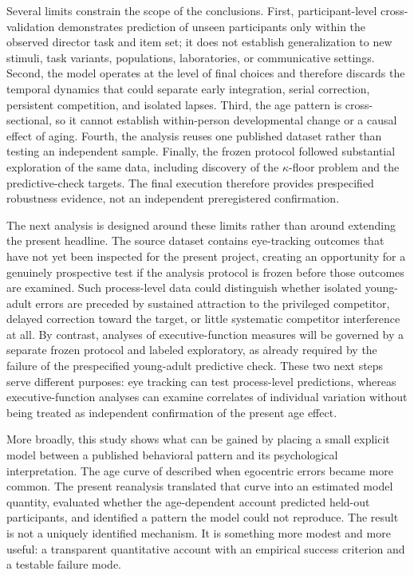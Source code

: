 \documentclass[11pt]{article}
\begin{document}
Several limits constrain the scope of the conclusions. First, participant-level
cross-validation demonstrates prediction of unseen participants only within the
observed director task and item set; it does not establish generalization to
new stimuli, task variants, populations, laboratories, or communicative
settings. Second, the model operates at the level of final choices and
therefore discards the temporal dynamics that could separate early integration,
serial correction, persistent competition, and isolated lapses. Third, the age
pattern is cross-sectional, so it cannot establish within-person developmental
change or a causal effect of aging. Fourth, the analysis reuses one published
dataset rather than testing an independent sample. Finally, the frozen protocol
followed substantial exploration of the same data, including discovery of the
$\kappa$-floor problem and the predictive-check targets. The final execution
therefore provides prespecified robustness evidence, not an independent
preregistered confirmation.

The next analysis is designed around these limits rather than around extending
the present headline. The source dataset contains eye-tracking outcomes that
have not yet been inspected for the present project, creating an opportunity
for a genuinely prospective test if the analysis protocol is frozen before
those outcomes are examined. Such process-level data could distinguish whether
isolated young-adult errors are preceded by sustained attraction to the
privileged competitor, delayed correction toward the target, or little
systematic competitor interference at all. By contrast, analyses of
executive-function measures will be governed by a separate frozen protocol and
labeled exploratory, as already required by the failure of the prespecified
young-adult predictive check. These two next steps serve different purposes:
eye tracking can test process-level predictions, whereas executive-function
analyses can examine correlates of individual variation without being treated
as independent confirmation of the present age effect.

More broadly, this study shows what can be gained by placing a small explicit
model between a published behavioral pattern and its psychological
interpretation. The age curve of \citet{bradford2023} described when egocentric
errors became more common. The present reanalysis translated that curve into an
estimated model quantity, evaluated whether the age-dependent account predicted
held-out participants, and identified a pattern the model could not reproduce.
The result is not a uniquely identified mechanism. It is something more modest
and more useful: a transparent quantitative account with an empirical success
criterion and a testable failure mode.
\end{document}
